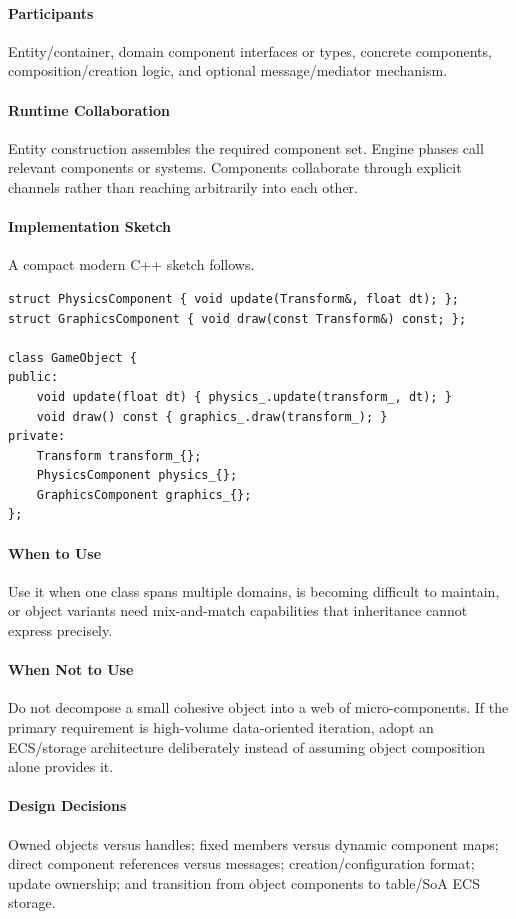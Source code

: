 \documentclass[11pt]{article}
\begin{document}
\paragraph{Participants} Entity/container, domain component interfaces or types, concrete components, composition/creation logic, and optional message/mediator mechanism.
\paragraph{Runtime Collaboration} Entity construction assembles the required component set. Engine phases call relevant components or systems. Components collaborate through explicit channels rather than reaching arbitrarily into each other.
\paragraph{Implementation Sketch} A compact modern C++ sketch follows.
\begin{lstlisting}
struct PhysicsComponent { void update(Transform&, float dt); };
struct GraphicsComponent { void draw(const Transform&) const; };

class GameObject {
public:
    void update(float dt) { physics_.update(transform_, dt); }
    void draw() const { graphics_.draw(transform_); }
private:
    Transform transform_{};
    PhysicsComponent physics_{};
    GraphicsComponent graphics_{};
};
\end{lstlisting}
\paragraph{When to Use} Use it when one class spans multiple domains, is becoming difficult to maintain, or object variants need mix-and-match capabilities that inheritance cannot express precisely.
\paragraph{When Not to Use} Do not decompose a small cohesive object into a web of micro-components. If the primary requirement is high-volume data-oriented iteration, adopt an ECS/storage architecture deliberately instead of assuming object composition alone provides it.
\paragraph{Design Decisions} Owned objects versus handles; fixed members versus dynamic component maps; direct component references versus messages; creation/configuration format; update ownership; and transition from object components to table/SoA ECS storage.
\end{document}
